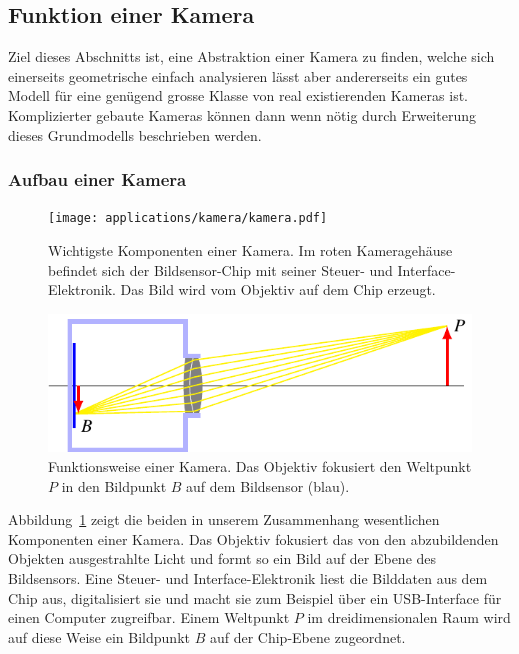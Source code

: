 %
%
%
\subsection{Funktion einer Kamera\label{subsection:kamerafunktion}}
Ziel dieses Abschnitts ist, eine Abstraktion einer Kamera zu finden,
welche sich einerseits geometrische einfach analysieren lässt aber
andererseits ein gutes Modell für eine genügend grosse Klasse von
real existierenden Kameras ist.
Komplizierter gebaute Kameras können dann wenn nötig durch Erweiterung dieses
Grundmodells beschrieben werden.
\subsubsection{Aufbau einer Kamera}
\begin{figure}
\centering
\texttt{[image: applications/kamera/kamera.pdf]}
\caption{Wichtigste Komponenten einer Kamera. Im roten Kameragehäuse befindet
sich der Bildsensor-Chip mit seiner Steuer- und Interface-Elektronik.
Das Bild wird vom Objektiv auf dem Chip erzeugt.
\label{applications:kamera:kamera-bild}}
\end{figure}
\begin{figure}
\centering
\includegraphics{applications/kamera/kameraprinzip.pdf}
\caption{Funktionsweise einer Kamera. Das Objektiv fokusiert den
Weltpunkt $P$ in den Bildpunkt $B$ auf dem Bildsensor ({\color{blue}blau}).
\label{applications:kamera:kameraprinzip}}
\end{figure}
Abbildung~\ref{applications:kamera:kamera-bild} zeigt die beiden in unserem
Zusammenhang wesentlichen Komponenten einer Kamera.
Das Objektiv fokusiert das von den abzubildenden Objekten ausgestrahlte
Licht und formt so ein Bild auf der Ebene des Bildsensors.
Eine Steuer- und Interface-Elektronik liest die Bilddaten aus dem Chip
aus, digitalisiert sie und macht sie zum Beispiel über ein USB-Interface
für einen Computer zugreifbar.
Einem Weltpunkt $P$ im dreidimensionalen Raum wird auf diese Weise ein
Bildpunkt $B$ auf der Chip-Ebene zugeordnet.

